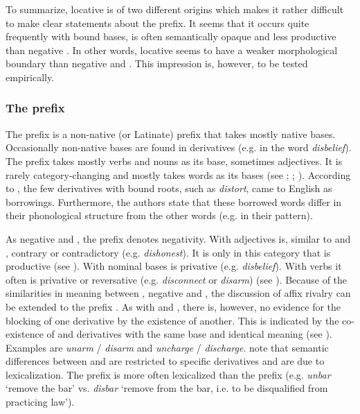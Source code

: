 To summarize, locative  is of two different origins which makes it rather difficult to make clear statements about the prefix. It seems that it occurs quite frequently with bound bases, is often semantically opaque and less productive than negative . In other words, locative  seems to have a weaker morphological boundary than negative  and . This impression is, however, to be tested empirically.

 
\subsubsection{The prefix }

The prefix  is a non-native (or Latinate) prefix that takes mostly native bases. Occasionally non-native bases are found in derivatives (e.g. in the word \textit{disbelief}). The prefix takes mostly verbs and nouns as its base, sometimes adjectives. It is rarely category-changing and mostly takes words as its bases (see \citealt[481]{Jespersen.1965}; \citealt[158 ff]{Marchand.1969}; \citealt[355, 357]{Bauer.2013}).
According to \citet[358]{Bauer.2013}, the few derivatives with bound roots, such as \textit{distort}, came to English as borrowings. Furthermore, the authors state that these borrowed words differ in their phonological structure from the other words (e.g. in their  pattern).


As negative  and , the prefix  denotes negativity.  With adjectives  is, similar to  and , contrary or contradictory (e.g. \textit{dishonest}). It is only in this category that  is productive (see \citealt[358]{Bauer.2013}). With nominal bases  is privative (e.g. \textit{disbelief}). With verbs it often is privative or reversative (e.g. \textit{disconnect} or \textit{disarm})  (see \citealt[372, 375]{Bauer.2013}).
Because of the similarities in meaning between , negative  and , the discussion of affix rivalry can be extended to the prefix . 
As with  and , there is, however, no evidence for the blocking of one derivative by the existence of another. This is indicated by the co-existence of  and derivatives with the same base and identical meaning (see \citealt[380]{Bauer.2013}). Examples are \textit{unarm} / \textit{disarm} and \textit{uncharge} / \textit{discharge}. 
\citet[380]{Bauer.2013} note that semantic differences between  and  are restricted to specific derivatives and are due to lexicalization. The prefix  is more often lexicalized than the prefix  (e.g. \textit{unbar} `remove the bar' vs. \textit{disbar} `remove from the bar, i.e. to be disqualified from practicing law').

